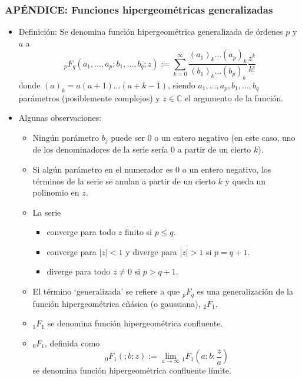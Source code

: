 \documentclass[11pt,a4paper]{article}
\begin{document}
\subsubsection{APÉNDICE: Funciones hipergeométricas generalizadas}
\begin{itemize}
\item Definición: Se denomina función hipergeométrica generalizada de órdenes $p$ y $a$ a
$${}_{p}F_{q}(a_{1}, \dots, a_{p}; b_{1}, \dots, b_{q}; z) := \sum_{k=0}^{\infty} \frac{(a_{1})_{k} \dots (a_{p})_{k}}{(b_{1})_{k} \dots (b_{p})_{k}} \frac{z^{k}}{k!}$$
donde $(a)_{k} = a(a+1) \dots (a+k-1)$, siendo $a_{1}, \dots, a_{p}, b_{1}, \dots, b_{q}$ parámetros (posiblemente complejos) y $z \in \mathbb{C}$ el argumento de la función.

\item Algunas observaciones:
\begin{itemize}
\item Ningún parámetro $b_{j}$ puede ser 0 o un entero negativo (en este caso, uno de los denominadores de la serie sería 0 a partir de un cierto $k$).

\item Si algún parámetro en el numerador es 0 o un entero negativo, los términos de la serie se anulan a partir de un cierto $k$ y queda un polinomio en $z$.

\item La serie
\begin{itemize}
\item converge para todo $z$ finito si $p \leq q$.
\item converge para $|z| < 1$ y diverge para $|z|>1$ si $p=q+1$.
\item diverge para todo $z \neq 0$ si $p > q + 1$.
\end{itemize}

\item El término `generalizada' se refiere a que ${}_{p}F_{q}$ es una generalización de la función hipergeométrica cñásica (o gaussiana), $_{2}F_{1}$.

\item $_{1}F_{1}$ se denomina función hipergeométrica confluente.

\item $_{0}F_{1}$, definida como
$${}_{0}F_{1}(;b;z) := \lim\limits_{a \to \infty} {}_{1}F_{1}(a;b;\frac{z}{a})$$
se denomina función hipergeométrica confluente límite.
\end{itemize}
\end{itemize}
\end{document}
